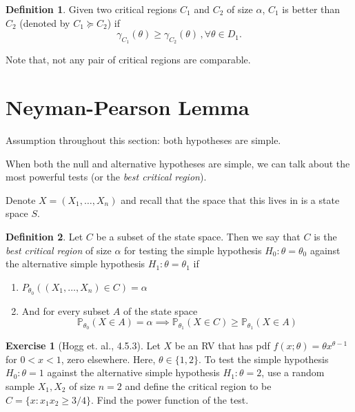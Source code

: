 \documentclass[
  openany]{book}
\theoremstyle{definition}
\newtheorem{definition}{Definition}[chapter]
\theoremstyle{definition}
\theoremstyle{definition}
\newtheorem{exercise}{Exercise}[chapter]
\theoremstyle{definition}
\theoremstyle{remark}
\begin{document}
\begin{definition}
Given two critical regions \(C_1\) and \(C_2\) of size \(\alpha\), \(C_1\)
is better than \(C_2\) (denoted by \(C_1 \succeq C_2\)) if
\[\gamma_{C_1}(\theta) \geq \gamma_{C_2}(\theta)\,, \forall  \theta \in D_1.\]
\end{definition}

Note that, not any pair of critical regions are comparable.

\hypertarget{neyman-pearson-lemma}{%
\section{Neyman-Pearson Lemma}\label{neyman-pearson-lemma}}

\begin{bbox}

Assumption throughout this section: both hypotheses are simple.

\end{bbox}

When both the null and alternative hypotheses are simple, we can talk about
the most powerful tests (or the \emph{best critical region}).

Denote \(X = (X_1, \dots, X_n)\) and recall that the space that this lives in
is a state space \(S\).

\begin{definition}

Let \(C\) be a subset of the state space.
Then we say that \(C\) is the \emph{best critical region} of size \(\alpha\) for testing
the simple hypothesis \(H_0: \theta = \theta_0\) against the alternative simple
hypothesis \(H_1: \theta = \theta_1\) if

\begin{enumerate}
\def\labelenumi{\alph{enumi}.}
\item
  \(P_{\theta_0}( (X_1, \dots, X_n) \in C ) = \alpha\)
\item
  And for every subset \(A\) of the state space
  \[ \mathbb{P}_{\theta_0}( X \in A) = \alpha \implies \mathbb{P}_{\theta_1}(X \in C) \geq \mathbb{P}_{\theta_1} ( X \in A)\]
\end{enumerate}

\end{definition}

\begin{exercise}[Hogg et. al., 4.5.3]
Let \(X\) be an RV that has pdf \(f(x;\theta) = \theta x^{\theta - 1}\) for \(0<x<1\), zero elsewhere.
Here, \(\theta \in \{ 1,2\}\).
To test the simple hypothesis \(H_0: \theta = 1\) against the alternative
simple hypothesis \(H_1: \theta = 2\), use a random sample \(X_1, X_2\) of size
\(n = 2\) and define the critical region to be \(C = \{ x: x_1 x_2 \geq 3/4 \}\).
Find the power function of the test.
\end{exercise}
\end{document}
